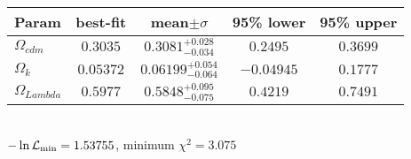 \begin{tabular}{|l|c|c|c|c|} 
 \hline 
Param & best-fit & mean$\pm\sigma$ & 95\% lower & 95\% upper \\ \hline 
$\Omega{}_{cdm }$ &$0.3035$ & $0.3081_{-0.034}^{+0.028}$ & $0.2495$ & $0.3699$ \\ 
$\Omega{}_{k }$ &$0.05372$ & $0.06199_{-0.064}^{+0.054}$ & $-0.04945$ & $0.1777$ \\ 
$\Omega{}_{Lambda }$ &$0.5977$ & $0.5848_{-0.075}^{+0.095}$ & $0.4219$ & $0.7491$ \\ 
\hline 
 \end{tabular} \\ 
$-\ln{\cal L}_\mathrm{min} =1.53755$, minimum $\chi^2=3.075$ \\ 
